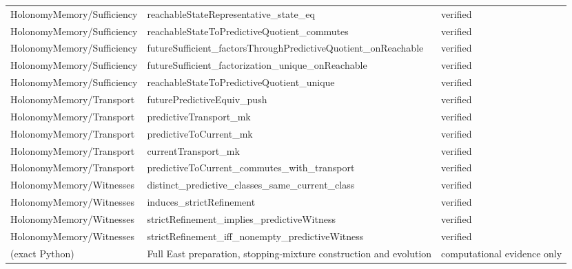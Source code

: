 \begin{longtable}{>{\raggedright\arraybackslash}p{3.6cm}>{\raggedright\arraybackslash}p{8.4cm}p{2.9cm}}
HolonomyMemory/\allowbreak{}Sufficiency & reachableStateRepresentative\_\allowbreak{}state\_\allowbreak{}eq & verified \\
HolonomyMemory/\allowbreak{}Sufficiency & reachableStateToPredictiveQuotient\_\allowbreak{}commutes & verified \\
HolonomyMemory/\allowbreak{}Sufficiency & futureSufficient\_\allowbreak{}factorsThroughPredictiveQuotient\_\allowbreak{}onReachable & verified \\
HolonomyMemory/\allowbreak{}Sufficiency & futureSufficient\_\allowbreak{}factorization\_\allowbreak{}unique\_\allowbreak{}onReachable & verified \\
HolonomyMemory/\allowbreak{}Sufficiency & reachableStateToPredictiveQuotient\_\allowbreak{}unique & verified \\
HolonomyMemory/\allowbreak{}Transport & futurePredictiveEquiv\_\allowbreak{}push & verified \\
HolonomyMemory/\allowbreak{}Transport & predictiveTransport\_\allowbreak{}mk & verified \\
HolonomyMemory/\allowbreak{}Transport & predictiveToCurrent\_\allowbreak{}mk & verified \\
HolonomyMemory/\allowbreak{}Transport & currentTransport\_\allowbreak{}mk & verified \\
HolonomyMemory/\allowbreak{}Transport & predictiveToCurrent\_\allowbreak{}commutes\_\allowbreak{}with\_\allowbreak{}transport & verified \\
HolonomyMemory/\allowbreak{}Witnesses & distinct\_\allowbreak{}predictive\_\allowbreak{}classes\_\allowbreak{}same\_\allowbreak{}current\_\allowbreak{}class & verified \\
HolonomyMemory/\allowbreak{}Witnesses & induces\_\allowbreak{}strictRefinement & verified \\
HolonomyMemory/\allowbreak{}Witnesses & strictRefinement\_\allowbreak{}implies\_\allowbreak{}predictiveWitness & verified \\
HolonomyMemory/\allowbreak{}Witnesses & strictRefinement\_\allowbreak{}iff\_\allowbreak{}nonempty\_\allowbreak{}predictiveWitness & verified \\
(exact Python) & Full East preparation, stopping-mixture construction and evolution & computational evidence only \\
\bottomrule
\end{longtable}
